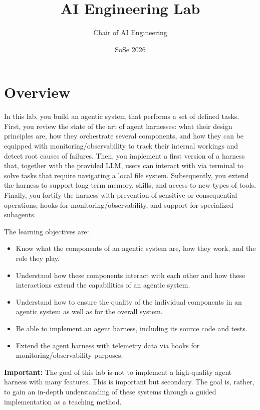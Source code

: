 \documentclass{article}
\title{AI Engineering Lab}
\author{Chair of AI Engineering}
\date{SoSe 2026}
\begin{document}
\maketitle

\section{Overview}

In this lab, you build an agentic system that performs a set of defined tasks. First, you review the state of the art of agent harnesses: what their design principles are, how they orchestrate several components, and how they can be equipped with monitoring/observability to track their internal workings and detect root causes of failures. Then, you implement a first version of a harness that, together with the provided LLM, users can interact with via terminal to solve tasks that require navigating a local file system. Subsequently, you extend the harness to support long-term memory, skills, and access to new types of tools. Finally, you fortify the harness with prevention of sensitive or consequential operations, hooks for monitoring/observability, and support for specialized subagents.

\vspace{5px}

\noindent The learning objectives are:

\begin{itemize}
    \item Know what the components of an agentic system are, how they work, and the role they play.
    \item Understand how these components interact with each other and how these interactions extend the capabilities of an agentic system.
    \item Understand how to ensure the quality of the individual components in an agentic system as well as for the overall system. 
    \item Be able to implement an agent harness, including its source code and tests.
    \item Extend the agent harness with telemetry data via hooks for monitoring/observability purposes. 
\end{itemize}

\noindent \textbf{Important:} The goal of this lab is not to implement a high-quality agent harness with many features. This is important but secondary. The  goal is, rather, to gain an in-depth understanding of these systems through a guided implementation as a teaching method.
\end{document}
